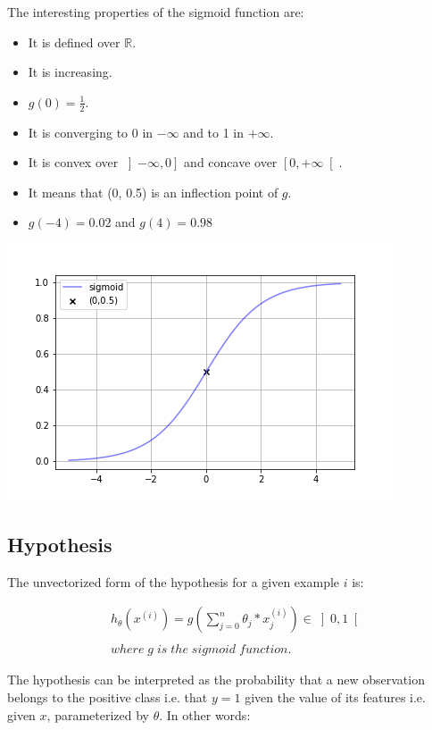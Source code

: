 \documentclass[a4paper, 12pt]{article}
\begin{document}
The interesting properties of the sigmoid function are:
\begin{itemize}
\item It is defined over $\mathbb{R}$.
\item It is increasing. 
\item $g(0) = \frac{1}{2}$.
\item It is converging to 0 in $-\infty$ and to 1 in $+\infty$.
\item It is convex over $\left] -\infty, 0 \right]$ and concave over $\left[ 0, +\infty \right[$.
\item It means that (0, 0.5) is an inflection point of $g$.
\item $g(-4) = 0.02 $ and $g(4) = 0.98 $
\end{itemize}

\begin{center}
  \includegraphics[scale=0.7]{sigmoid}
  \label{fig:sigmoid}
\end{center}

\subsection{Hypothesis}

\noindent
The unvectorized form of the hypothesis for a given example $i$ is:

\begin{align*}
& h_{\theta}(x^{(i)}) = g \left( \sum_{j=0}^{n} \theta_j * x_j^{(i)}  \right) \in \left]0, 1\right[  \\
& \\
& where \; g \; is \; the \; sigmoid \; function.
\end{align*}

The hypothesis can be interpreted as the probability that a new observation belongs to the positive class i.e. that $y=1$ given the value of its features i.e. given $x$, parameterized by $\theta$. In other words:
\end{document}
